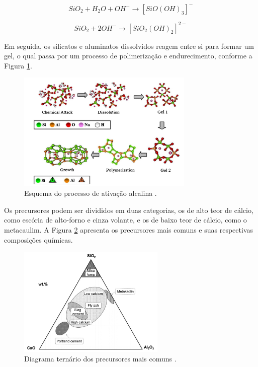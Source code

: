 \begin{equation}
  SiO_2 + H_2O + OH^- \rightarrow \left[SiO(OH)_3\right]^- 
\end{equation}

\begin{equation}
  SiO_2 + 2OH^- \rightarrow \left[SiO_2(OH)_2\right]^{2-}
\end{equation}

Em seguida, os silicatos e aluminatos dissolvidos reagem entre si para formar um gel, o qual passa por um processo de polimerização e endurecimento, conforme a Figura \ref{fig:ativacao}.

\begin{figure}[ht]
  \centering
  \includegraphics[width=0.75\textwidth]{Cap2/ativacao.png}
  \caption{Esquema do processo de ativação alcalina \cite{duxson2006geopolymer}.}
  \label{fig:ativacao}
\end{figure}

Os precursores podem ser divididos em duas categorias, os de alto teor de cálcio, como escória de alto-forno e cinza volante, e os de baixo teor de cálcio, como o metacaulim.
A Figura \ref{fig:diagrama_ternario} apresenta os precursores mais comuns e suas respectivas composições químicas.
\begin{figure}[ht]
  \centering
  \includegraphics[width=0.625\textwidth]{Cap2/diagrama_ternario.png}
  \caption{Diagrama ternário dos precursores mais comuns \cite{giergiczny2019fly}.}
  \label{fig:diagrama_ternario}
\end{figure}

